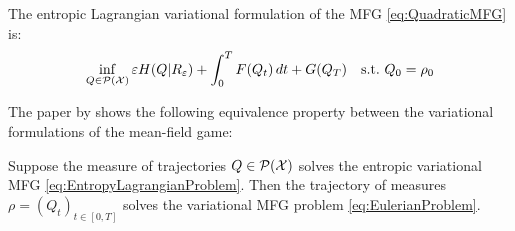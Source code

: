\documentclass[../report.tex]{subfiles}
\begin{document}
The entropic Lagrangian variational formulation of the MFG \eqref{eq:QuadraticMFG} is:
\begin{equation}\label{eq:EntropyLagrangianProblem}
	\inf_{Q\in\mathcal{P}(\mathcal{X})}
	\varepsilon H(Q|R_{\varepsilon}) + \int_0^T F(Q_t)\,dt + G(Q_T)\quad
	\mathrm{s.t.}\ Q_0 = \rho_0
\end{equation}


The paper by \textcite[sec.~4.2]{benamou2018entropy} shows the following equivalence property between the variational formulations of the mean-field game:
\begin{prop}
	Suppose the measure of trajectories $Q \in \mathcal{P}(\mathcal{X})$ solves the entropic variational MFG \eqref{eq:EntropyLagrangianProblem}. Then the trajectory of measures $\rho = (Q_t)_{t\in[0,T]}$ solves the variational MFG problem \eqref{eq:EulerianProblem}.
\end{prop}
\end{document}
